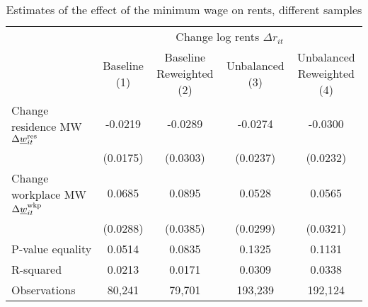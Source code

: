 \begin{table}[hbt!]
    \centering
    \caption{Estimates of the effect of the minimum wage on rents, different samples}
    \label{tab:static_sample}

    \begin{tabular}{@{}lcccc@{}}
        \toprule
                                             & \multicolumn{4}{c}{Change log rents $\Delta r_{it}$}                   \\ \cmidrule(l){2-5} 
                                             & \shortstack{Baseline\\(1)}       & \shortstack{Baseline\\Reweighted (2)}
                                             & \shortstack{Unbalanced\\(3)}     & \shortstack{Unbalanced\\Reweighted (4)}  \\ \midrule
        Change residence MW 
                  $\Delta\underline{w}_{it}^{\text{res}}$    & -0.0219      & -0.0289        & -0.0274       & -0.0300     \\
                                             & (0.0175)    & (0.0303)      & (0.0237)     & (0.0232)   \\
        Change workplace MW 
                   $\Delta\underline{w}_{it}^{\text{wkp}}$   & 0.0685      & 0.0895        & 0.0528       & 0.0565     \\
                                             & (0.0288)    & (0.0385)      & (0.0299)     & (0.0321)   \\ \midrule
        P-value equality                     & 0.0514      & 0.0835        & 0.1325       & 0.1131     \\
        R-squared                            & 0.0213      & 0.0171        & 0.0309       & 0.0338    \\
        Observations                         & 80,241     & 79,701       & 193,239      & 192,124   \\ \bottomrule
    \end{tabular}


\end{table}
